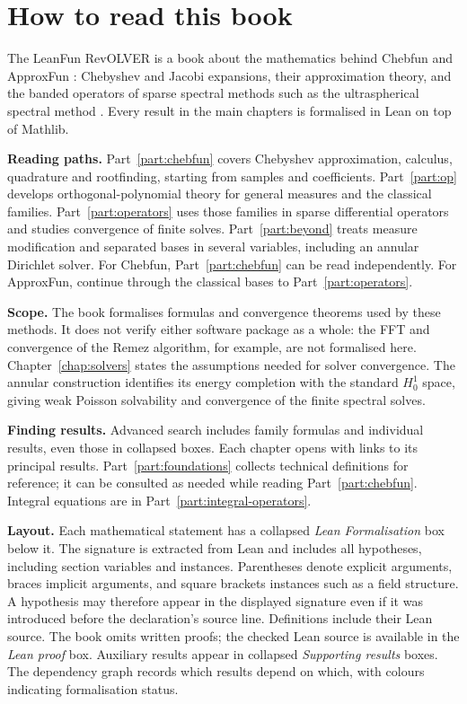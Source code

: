 \chapter*{How to read this book}
The LeanFun RevOLVER is a book about the mathematics behind Chebfun \cite{chebfun} and
ApproxFun \cite{approxfun-jl,approxfun}: Chebyshev and Jacobi expansions, their approximation theory, and the
banded operators of sparse spectral methods such as the ultraspherical spectral method \cite{olver-townsend}. Every result in the main chapters is
formalised in Lean on top of Mathlib.

\textbf{Reading paths.} Part~\ref{part:chebfun} covers Chebyshev approximation,
calculus, quadrature and rootfinding, starting from samples and coefficients.
Part~\ref{part:op} develops orthogonal-polynomial theory for general measures
and the classical families. Part~\ref{part:operators} uses those families in
sparse differential operators and studies convergence of finite solves.
Part~\ref{part:beyond} treats measure modification and separated bases in
several variables, including an annular Dirichlet solver. For Chebfun,
Part~\ref{part:chebfun} can be read independently. For ApproxFun, continue
through the classical bases to Part~\ref{part:operators}.

\textbf{Scope.} The book formalises formulas and convergence theorems used by
these methods. It does not verify either software package as a whole: the FFT
and convergence of the Remez algorithm, for example, are not formalised here.
Chapter~\ref{chap:solvers} states the assumptions needed for solver convergence.
The annular construction identifies its energy completion with the standard
$H^1_0$ space, giving weak Poisson solvability and convergence of the finite
spectral solves.

\textbf{Finding results.} Advanced search includes family formulas and
individual results, even those in collapsed boxes. Each chapter opens with
links to its principal results. Part~\ref{part:foundations} collects technical
definitions for reference; it can be consulted as needed while reading
Part~\ref{part:chebfun}. Integral equations are in
Part~\ref{part:integral-operators}.

\textbf{Layout.} Each mathematical statement has a collapsed \emph{Lean
Formalisation} box below it. The signature is extracted from Lean and includes
all hypotheses, including section variables and instances. Parentheses denote
explicit arguments, braces implicit arguments, and square brackets instances
such as a field structure. A hypothesis may therefore appear in the displayed
signature even if it was introduced before the declaration's source line.
Definitions include their Lean source. The book omits written proofs; the
checked Lean source is available in the \emph{Lean proof} box. Auxiliary
results appear in collapsed \emph{Supporting results} boxes. The dependency
graph records which results depend on which, with colours indicating
formalisation status.

